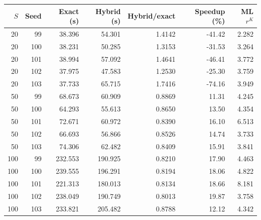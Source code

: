 \begin{tabular}{rrrrrrr}
\toprule
$S$ & Seed & Exact (s) & Hybrid (s) & Hybrid/exact & Speedup (\%) & ML $r^K$ \\
\midrule
20 & 99 & 38.396 & 54.301 & 1.4142 & -41.42 & 2.282 \\
\midrule
20 & 100 & 38.231 & 50.285 & 1.3153 & -31.53 & 3.264 \\
\midrule
20 & 101 & 38.994 & 57.092 & 1.4641 & -46.41 & 3.772 \\
\midrule
20 & 102 & 37.975 & 47.583 & 1.2530 & -25.30 & 3.759 \\
\midrule
20 & 103 & 37.733 & 65.715 & 1.7416 & -74.16 & 3.949 \\
50 & 99 & 68.673 & 60.909 & 0.8869 & 11.31 & 4.245 \\
\midrule
50 & 100 & 64.293 & 55.613 & 0.8650 & 13.50 & 4.354 \\
\midrule
50 & 101 & 72.671 & 60.972 & 0.8390 & 16.10 & 6.513 \\
\midrule
50 & 102 & 66.693 & 56.866 & 0.8526 & 14.74 & 3.733 \\
\midrule
50 & 103 & 74.306 & 62.482 & 0.8409 & 15.91 & 3.841 \\
100 & 99 & 232.553 & 190.925 & 0.8210 & 17.90 & 4.463 \\
\midrule
100 & 100 & 239.555 & 196.291 & 0.8194 & 18.06 & 4.822 \\
\midrule
100 & 101 & 221.313 & 180.013 & 0.8134 & 18.66 & 8.181 \\
\midrule
100 & 102 & 238.049 & 190.749 & 0.8013 & 19.87 & 3.758 \\
\midrule
100 & 103 & 233.821 & 205.482 & 0.8788 & 12.12 & 4.342 \\
\bottomrule
\end{tabular}

